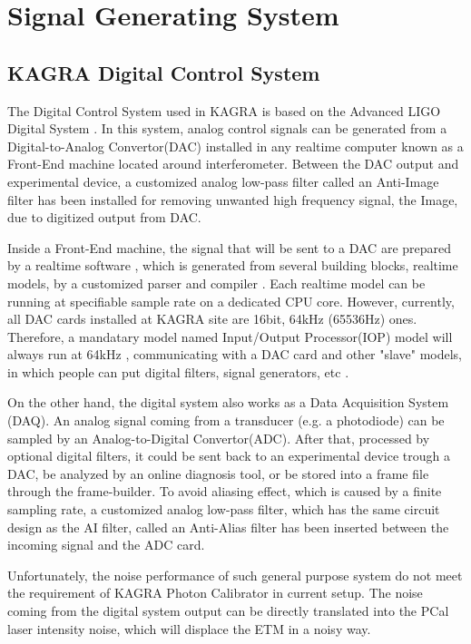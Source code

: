 \chapter{Signal Generating System}

\section{KAGRA Digital Control System}
The Digital Control System used in KAGRA is based on the Advanced LIGO Digital System \cite{dgs:overview}. In this system, analog control signals can be generated from a Digital-to-Analog Convertor(DAC) installed in any realtime computer known as a Front-End machine located around interferometer. Between the DAC output and experimental device, a customized analog low-pass filter called an Anti-Image filter \cite{dgs:aaai} has been installed for removing unwanted high frequency signal, the Image, due to digitized output from DAC. 

Inside a Front-End machine, the signal that will be sent to a DAC are prepared by a realtime software \cite{dgs:control.c}, which is generated from several building blocks, realtime models, by a customized parser and compiler \cite{dgs:rcg}. Each realtime model can be running at specifiable sample rate on a dedicated CPU core. However, currently, all DAC cards installed at KAGRA site are 16bit, 64kHz (65536Hz) ones. Therefore, a mandatary model named Input/Output Processor(IOP) model will always run at 64kHz \cite{dgs:control.c}, communicating with a DAC card and other "slave" models, in which people can put digital filters, signal generators, etc \cite{dgs:software_app}.



On the other hand, the digital system also works as a Data Acquisition System (DAQ). An analog signal coming from a transducer (e.g. a photodiode) can be sampled by an Analog-to-Digital Convertor(ADC). After that, processed by optional digital filters, it could be sent back to an experimental device trough a DAC, be analyzed by an online diagnosis tool, or be stored into a frame file through the frame-builder. To avoid aliasing effect, which is caused by a finite sampling rate, a customized analog low-pass filter, which has the same circuit design as the AI filter, called an Anti-Alias filter \cite{dgs:aaai} has been inserted between the incoming signal and the ADC card.

Unfortunately, the noise performance of such general purpose system do not meet the requirement of KAGRA Photon Calibrator in current setup. The noise coming from the digital system output can be directly translated into the PCal laser intensity noise, which will displace the ETM in a noisy way.   

